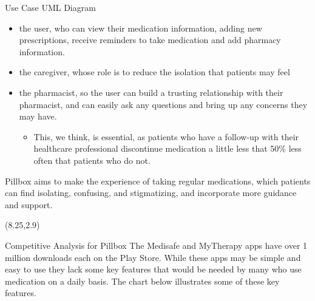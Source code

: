 \documentclass[22pt]{beamer}
\begin{document}
\begin{frame}[fragile]
\begin{textblock}{7.25}
\begin{block}{Use Case UML Diagram}
\begin{itemize} 
\item the user, who can view their medication information, adding new prescriptions, receive reminders to take medication and add pharmacy information. 
\item the caregiver, whose role is to reduce the isolation that patients may feel
\item the pharmacist,  so the user can build a trusting relationship with their pharmacist, and can easily ask any questions and bring up any concerns they may have. 
\begin{itemize}
\item This, we think, is essential, as patients who have a follow-up with their healthcare professional discontinue medication a little less that 50\% \cite{selmesmitchell2007} less often that patients who do not.
\end{itemize}

\end{itemize}

Pillbox aims to make the experience of taking regular medications, which patients can find isolating, confusing, and stigmatizing, and incorporate more guidance and support.  \\

\end{block}
\end{textblock}



\begin{textblock}{7.25}(8.25,2.9)



\begin{block}{Competitive Analysis for Pillbox}
The Medisafe and MyTherapy apps have over 1 million downloads each on the Play Store. While these apps may be simple and easy to use they lack some key features that would be needed by many who use medication on a daily basis. The chart below illustrates some of these key features.


\end{block}
\end{textblock}
\end{frame}
\end{document}
